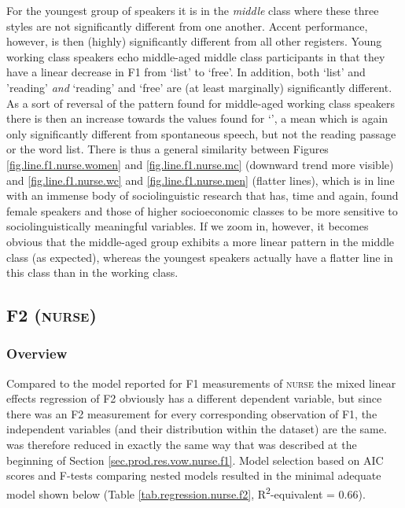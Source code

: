 For the youngest group of speakers it is in the \emph{middle} class where these three styles are not significantly different from one another.
Accent performance, however, is then (highly) significantly different from all other registers.
Young working class speakers echo middle-aged middle class participants in that they have a linear decrease in F1 from `list' to `free'.
In addition, both `list' and 'reading' \emph{and} `reading' and `free' are (at least marginally) significantly different.
As a sort of reversal of the pattern found for middle-aged working class speakers there is then an increase towards the values found for `', a mean which is again only significantly different from spontaneous speech, but not the reading passage or the word list.
There is thus a general similarity between Figures \ref{fig.line.f1.nurse.women} and \ref{fig.line.f1.nurse.mc} (downward trend more visible) and \ref{fig.line.f1.nurse.wc} and \ref{fig.line.f1.nurse.men} (flatter lines), which is in line with an immense body of sociolinguistic research that has, time and again, found female speakers and those of higher socioeconomic classes to be more sensitive to sociolinguistically meaningful variables.
If we zoom in, however, it becomes obvious that the middle-aged group exhibits a more linear pattern in the middle class (as expected), whereas the youngest speakers actually have a flatter line in this class than in the working class.

\subsection{F2 (\textrm{\textsc{nurse}})}
\label{sec.prod.res.vow.nurse.f2}

\subsubsection{Overview}
\label{sec.prod.res.vow.nurse.f2.overview}

Compared to the model reported for F1 measurements of \textsc{nurse} the mixed linear effects regression of F2 obviously has a different dependent variable, but since there was an F2 measurement for every corresponding observation of F1, the independent variables (and their distribution within the dataset) are the same.
 was therefore reduced in exactly the same way that was described at the beginning of Section \ref{sec.prod.res.vow.nurse.f1}.
Model selection based on AIC scores and F-tests comparing nested models resulted in the minimal adequate model shown below (Table \ref{tab.regression.nurse.f2}, R\textsuperscript{2}-equivalent = 0.66).

